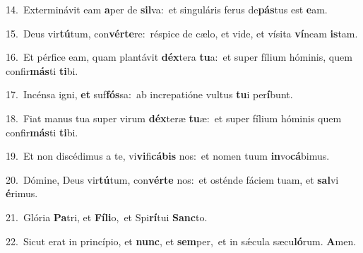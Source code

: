 {\numbfont\textcolor{\numbcolor}{14.}}~Exterminávit eam \textbf{a}\-per de \textbf{sil}\-va:~\star et singuláris ferus de\-\textbf{pás}\-tus est \textbf{e}\-am.\par
{\numbfont\textcolor{\numbcolor}{15.}}~Deus vir\-\textbf{tú}\-tum, con\-\textbf{vér}\-\textbf{te}re:~\star réspice de cælo, et vide, et vísita \textbf{ví}\-neam \textbf{is}\-tam.\par
{\numbfont\textcolor{\numbcolor}{16.}}~Et pérfice eam, quam plantávit \textbf{déx}\-tera \textbf{tu}\-a:~\star et super fílium hóminis, quem confir\-\textbf{más}\-ti \textbf{ti}\-bi.\par
{\numbfont\textcolor{\numbcolor}{17.}}~Incénsa igni, \textbf{et} suf\-\textbf{fós}\-sa:~\star ab increpatióne vultus \textbf{tu}\-i per\-\textbf{í}\-bunt.\par
{\numbfont\textcolor{\numbcolor}{18.}}~Fiat manus tua super virum \textbf{déx}\-teræ \textbf{tu}\-æ:~\star et super fílium hóminis quem confir\-\textbf{más}\-ti \textbf{ti}\-bi.\par
{\numbfont\textcolor{\numbcolor}{19.}}~Et non discédimus a te, vi\-\textbf{vi}\-fi\-\textbf{cá}\-\textbf{bis} nos:~\star et nomen tuum \textbf{in}\-vo\-\textbf{cá}\-bimus.\par
{\numbfont\textcolor{\numbcolor}{20.}}~Dómine, Deus vir\-\textbf{tú}\-tum, con\-\textbf{vér}\-\textbf{te} nos:~\star et osténde fáciem tuam, et \textbf{sal}\-vi \textbf{é}\-rimus.\par
{\numbfont\textcolor{\numbcolor}{21.}}~Glória \textbf{Pa}\-tri, et \textbf{Fí}\-\textbf{li}o,~\star et Spi\-\textbf{rí}\-tui \textbf{Sanc}\-to.\par
{\numbfont\textcolor{\numbcolor}{22.}}~Sicut erat in princípio, et \textbf{nunc}\-, et \textbf{sem}\-per,~\star et in sǽcula sæcu\-\textbf{ló}\-rum. \textbf{A}\-men.\par
